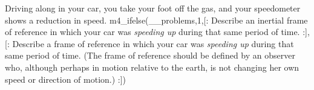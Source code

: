  Driving along in your car, you take your foot off the
gas, and your speedometer shows a reduction in speed.
m4_ifelse(__problems,1,[:%
Describe an inertial frame of reference in which your car was
\emph{speeding up} during that same period of time.
:],[:%
Describe a frame of reference in which your car was
\emph{speeding up} during that same period of time. (The
frame of reference should be defined by an observer who,
although perhaps in motion relative to the earth, is not
changing her own speed or direction of motion.)
:])

